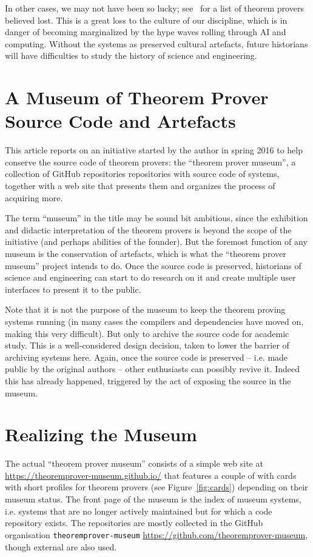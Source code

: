 \documentclass[smallcondensed]{svjour3}
\begin{document}
In other cases, we may not have been so lucky; see~\cite{tpmuseum:tpbl:on} for a list of
theorem provers believed lost. This is a great loss to the culture of our discipline,
which is in danger of becoming marginalized by the hype waves rolling through AI and
computing. Without the systems as preserved cultural artefacts, future historians will
have difficulties to study the history of science and engineering.

\section{A Museum of Theorem Prover Source Code and Artefacts}

This article reports on an initiative started by the author in spring 2016 to help
conserve the source code of theorem provers: the ``theorem prover museum'', a collection
of GitHub repositories repositories with source code of systems, together with a web site
that presents them and organizes the process of acquiring more.

The term ``museum'' in the title may be sound bit ambitious, since the exhibition and
didactic interpretation of the theorem provers is beyond the scope of the initiative (and
perhaps abilities of the founder). But the foremost function of any museum is the
conservation of artefacts, which is what the ``theorem prover museum'' project intends to
do. Once the source code is preserved, historians of science and engineering can start to
do research on it and create multiple user interfaces to present it to the public. 

Note that it is not the purpose of the museum to keep the theorem proving systems running
(in many cases the compilers and dependencies have moved on, making this very
difficult). But only to archive the source code for academic study.  This is a
well-considered design decision, taken to lower the barrier of archiving systems
here. Again, once the source code is preserved -- i.e. made public by the original authors
-- other enthusiasts can possibly revive it. Indeed this has already happened, triggered
by the act of exposing the source in the museum.

\section{Realizing the Museum}

The actual ``theorem prover museum'' consists of a simple web site at
\url{https://theoremprover-museum.github.io/} that features a couple of with cards with
short profiles for theorem provers (see Figure~\ref{fig:cards}) depending on their museum
status. The front page of the museum is the index of museum systems, i.e. systems that are
no longer actively maintained but for which a code repository exists. The repositories are
mostly collected in the GitHub organisation \texttt{theoremprover-museum}
\url{https://github.com/theoremprover-museum}, though external are also used.
\end{document}
